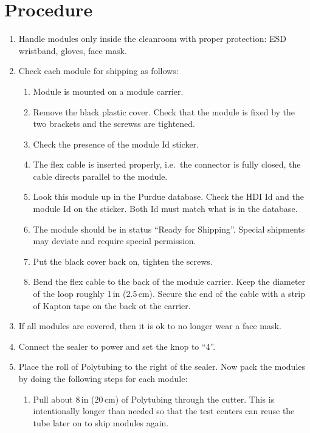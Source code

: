 \documentclass[12pt]{unlsilabsop}
\begin{document}
\section{Procedure}

\begin{enumerate}
    \item Handle modules only inside the cleanroom with proper protection: ESD wristband, gloves, face mask.
    \item Check each module for shipping as follows:
    \begin{enumerate}
        \item Module is mounted on a module carrier.
        \item Remove the black plastic cover. Check that the module is fixed by the two brackets and the screwss are tightened.
        \item Check the presence of the module Id sticker.
        \item The flex cable is inserted properly, i.e.~the connector is fully closed, the cable directs parallel to the module.
        \item Look this module up in the Purdue database. Check the HDI Id and the module Id on the sticker. Both Id must match what is in the database.
        \item The module should be in status ``Ready for Shipping''. Special shipments may deviate and require special permission.
        \item Put the black cover back on, tighten the screws.
        \item Bend the flex cable to the back of the module carrier. Keep the diameter of the loop roughly 1\,in (2.5\,cm). Secure the end of the cable with a strip of Kapton tape on the back ot the carrier.
    \end{enumerate}
    \item If all modules are covered, then it is ok to no longer wear a face mask.
    \item Connect the sealer to power and set the knop to ``4''.
    \item Place the roll of Polytubing to the right of the sealer. Now pack the modules by doing the following steps for each module:
    \begin{enumerate}
        \item Pull about 8\,in (20\,cm) of Polytubing through the cutter. This is intentionally longer than needed so that the test centers can reuse the tube later on to ship modules again.

\end{enumerate}
\end{enumerate}
\end{document}
